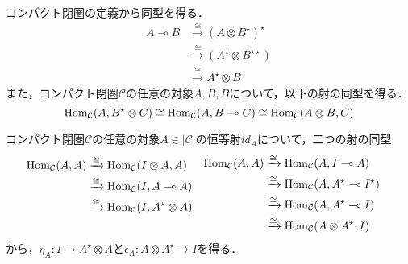 \documentclass[type_judgement.tex]{subfiles}
\begin{document}
コンパクト閉圏の定義から同型を得る．
\begin{align*}
    A \multimap B &\xrightarrow{\cong} (A \otimes B^\star)^\star \\
    &\xrightarrow{\cong} (A^\star \otimes B^{\star\star}) \\
    &\xrightarrow{\cong} A^\star \otimes B
\end{align*}
また，コンパクト閉圏$\mathcal{C}$の任意の対象$A,B,B$について，以下の射の同型を得る．
\begin{equation*}
    \mathop{\mathrm{Hom}}\nolimits_\mathcal{C}(A, B^\star \otimes C) \cong \mathop{\mathrm{Hom}}\nolimits_\mathcal{C}(A, B \multimap C) \cong \mathop{\mathrm{Hom}}\nolimits_\mathcal{C}(A \otimes B, C)
\end{equation*}

コンパクト閉圏$\mathcal{C}$の任意の対象$A\in|\mathcal{C}|$の恒等射$id_A$について，二つの射の同型
\begin{align*}
&\begin{aligned}
    \mathop{\mathrm{Hom}}\nolimits_\mathcal{C}(A, A) &\xrightarrow{\cong} \mathop{\mathrm{Hom}}\nolimits_\mathcal{C}(I \otimes A, A) \\
    &\xrightarrow{\cong} \mathop{\mathrm{Hom}}\nolimits_\mathcal{C}(I, A \multimap A) \\
    &\xrightarrow{\cong} \mathop{\mathrm{Hom}}\nolimits_\mathcal{C}(I, A^\star \otimes A) \\
    &
\end{aligned}
&
&\begin{aligned}
    \mathop{\mathrm{Hom}}\nolimits_\mathcal{C}(A, A) &\xrightarrow{\cong} \mathop{\mathrm{Hom}}\nolimits_\mathcal{C}(A, I \multimap A) \\
    &\xrightarrow{\cong} \mathop{\mathrm{Hom}}\nolimits_\mathcal{C}(A, A^\star \multimap I^\star) \\
    &\xrightarrow{\cong} \mathop{\mathrm{Hom}}\nolimits_\mathcal{C}(A, A^\star \multimap I) \\
    &\xrightarrow{\cong} \mathop{\mathrm{Hom}}\nolimits_\mathcal{C}(A \otimes A^\star, I)
\end{aligned}
\end{align*}
から，$\eta_A:I \rightarrow A^\star \otimes A$と$\epsilon_A:A \otimes A^\star \rightarrow I$を得る．
\end{document}
